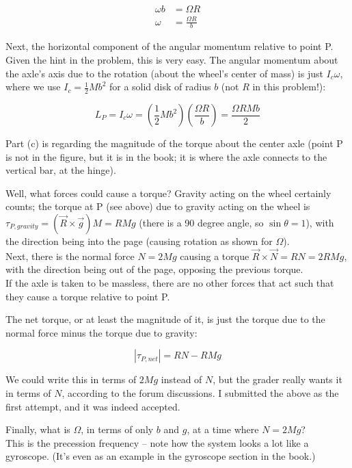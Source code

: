 \documentclass[8.01x]{subfiles}
\begin{document}
\begin{align}
\omega b &= \Omega R\\
\omega   &= \frac{\Omega R}{b}
\end{align}

Next, the horizontal component of the angular momentum relative to point P. Given the hint in the problem, this is very easy. The angular momentum about the axle's axis due to the rotation (about the wheel's center of mass) is just $I_c \omega$, where we use $I_c = \frac{1}{2} M b^2$ for a solid disk of radius $b$ (not $R$ in this problem!):

\begin{equation}
L_P = I_c \omega = (\frac{1}{2} M b^2)\left(\frac{\Omega R}{b}\right) = \frac{\Omega R M b}{2}
\end{equation}

Part (c) is regarding the magnitude of the torque about the center axle (point P is not in the figure, but it is in the book; it is where the axle connects to the vertical bar, at the hinge).

Well, what forces could cause a torque? Gravity acting on the wheel certainly counts; the torque at P (see above) due to gravity acting on the wheel is $\tau_{P,gravity} = (\vec{R} \times \vec{g}) M = R M g$ (there is a 90 degree angle, so $\sin \theta = 1$), with the direction being into the page (causing rotation as shown for $\Omega$).\\
Next, there is the normal force $N = 2 M g$ causing a torque $\vec{R} \times \vec{N} = R N = 2 R M g$, with the direction being out of the page, opposing the previous torque.\\
If the axle is taken to be massless, there are no other forces that act such that they cause a torque relative to point P.

The net torque, or at least the magnitude of it, is just the torque due to the normal force minus the torque due to gravity:

\begin{equation}
|\tau_{P,net}| = R N - R M g
\end{equation}

We could write this in terms of $2 M g$ instead of $N$, but the grader really wants it in terms of $N$, according to the forum discussions. I submitted the above as the first attempt, and it was indeed accepted.

Finally, what is $\Omega$, in terms of only $b$ and $g$, at a time where $N = 2 M g$?\\
This is the precession frequency -- note how the system looks a lot like a gyroscope. (It's even as an example in the gyroscope section in the book.)
\end{document}
